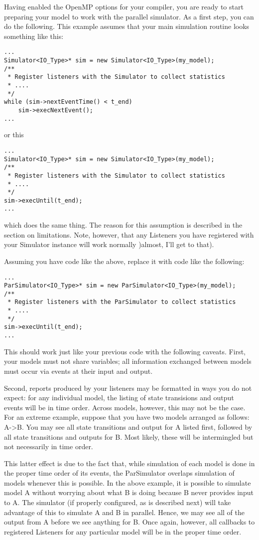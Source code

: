Having enabled the OpenMP options for your compiler, you are ready to start preparing your model to work with the parallel simulator. As a first step, you can do the following. This example assumes that your main simulation routine looks something like this:
\begin{verbatim}
...
Simulator<IO_Type>* sim = new Simulator<IO_Type>(my_model);
/**
 * Register listeners with the Simulator to collect statistics
 * ....
 */
while (sim->nextEventTime() < t_end)
    sim->execNextEvent();
...
\end{verbatim}
or this
\begin{verbatim}
...
Simulator<IO_Type>* sim = new Simulator<IO_Type>(my_model);
/**
 * Register listeners with the Simulator to collect statistics
 * ....
 */
sim->execUntil(t_end);
...
\end{verbatim}
which does the same thing. The reason for this assumption is described in the section on limitations. Note, however, that any Listeners you have registered with your Simulator instance will work normally )almost, I'll get to that).

Assuming you have code like the above, replace it with code like the following:
\begin{verbatim}
...
ParSimulator<IO_Type>* sim = new ParSimulator<IO_Type>(my_model);
/**
 * Register listeners with the ParSimulator to collect statistics
 * ....
 */
sim->execUntil(t_end);
...
\end{verbatim}
This should work just like your previous code with the following caveats. First, your models must not share variables; all information exchanged between models must occur via events at their input and output.

Second, reports produced by your listeners may be formatted in ways you do not expect: for any individual model, the listing of state transisions and output events will be in time order. Across models, however, this may not be the case. For an extreme example, suppose that you have two models arranged as follows: A->B. You may see all state transitions and output for A listed first, followed by all state transitions and outputs for B. Most likely, these will be intermingled but not necessarily in time order.

This latter effect is due to the fact that, while simulation of each model is done in the proper time order of its events, the ParSimulator overlaps simulation of models whenever this is possible. In the above example, it is possible to simulate model A without worrying about what B is doing because B never provides input to A. The simulator (if properly configured, as is described next) will take advantage of this to simulate A and B in parallel. Hence, we may see all of the output from A before we see anything for B. Once again, however, all callbacks to registered Listeners for any particular model will be in the proper time order.

